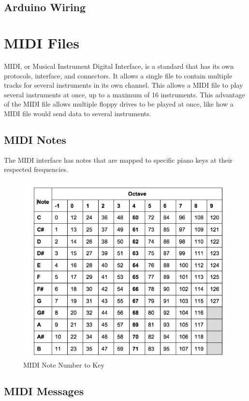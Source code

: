 \documentclass[11pt, a4paper]{report}
\begin{document}
\section{Arduino Wiring}


\chapter{MIDI Files}

  MIDI, or Musical Instrument Digital Interface, is a standard that has its own protocols, interface, and connectors. It allows a single file to contain multiple tracks for several instruments in its own channel. This allows a MIDI file to play several instruments at once, up to a maximum of 16 instruments. This advantage of the MIDI file allows multiple floppy drives to be played at once, like how a MIDI file would send data to several instruments. 

\section{MIDI Notes}

The MIDI interface has notes that are mapped to specific piano keys at their respected frequencies. 
\begin{figure}[H]
\hspace*{-2cm}    
    \centering
    \includegraphics[width=.75\textwidth]{midi_notechart.jpg}
    \caption{MIDI Note Number to Key}
\end{figure}

\section{MIDI Messages}
\end{document}
